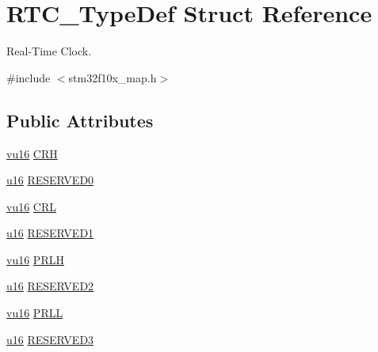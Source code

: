 \hypertarget{struct_r_t_c___type_def}{}\section{R\+T\+C\+\_\+\+Type\+Def Struct Reference}
\label{struct_r_t_c___type_def}


Real-\/\+Time Clock.  




{\ttfamily \#include $<$stm32f10x\+\_\+map.\+h$>$}

\subsection*{Public Attributes}
\begin{DoxyCompactItemize}
\item 
\hyperlink{agilefox_2library_2inc_2stm32f10x__type_8h_a9e9f2c67df0bbcd2dd7753693525ee07}{vu16} \hyperlink{struct_r_t_c___type_def_a8eb1b48381b16f72b508cc7d55338737}{C\+RH}
\item 
\hyperlink{agilefox_2library_2inc_2stm32f10x__type_8h_a9e6c91d77e24643b888dbd1a1a590054}{u16} \hyperlink{struct_r_t_c___type_def_a333883fc62c0c65191bd0e825a879b3c}{R\+E\+S\+E\+R\+V\+E\+D0}
\item 
\hyperlink{agilefox_2library_2inc_2stm32f10x__type_8h_a9e9f2c67df0bbcd2dd7753693525ee07}{vu16} \hyperlink{struct_r_t_c___type_def_a777228792aa47e88c33492c356646865}{C\+RL}
\item 
\hyperlink{agilefox_2library_2inc_2stm32f10x__type_8h_a9e6c91d77e24643b888dbd1a1a590054}{u16} \hyperlink{struct_r_t_c___type_def_acf6a76e18964d92f3e126dd04369dd8a}{R\+E\+S\+E\+R\+V\+E\+D1}
\item 
\hyperlink{agilefox_2library_2inc_2stm32f10x__type_8h_a9e9f2c67df0bbcd2dd7753693525ee07}{vu16} \hyperlink{struct_r_t_c___type_def_aad7497095513a3ff014d992635749a6b}{P\+R\+LH}
\item 
\hyperlink{agilefox_2library_2inc_2stm32f10x__type_8h_a9e6c91d77e24643b888dbd1a1a590054}{u16} \hyperlink{struct_r_t_c___type_def_a73b05aa7838f6f0d4eee7958a8e33eb8}{R\+E\+S\+E\+R\+V\+E\+D2}
\item 
\hyperlink{agilefox_2library_2inc_2stm32f10x__type_8h_a9e9f2c67df0bbcd2dd7753693525ee07}{vu16} \hyperlink{struct_r_t_c___type_def_a9b6eaa7ffd3f91456d66fb0a1d629e6e}{P\+R\+LL}
\item 
\hyperlink{agilefox_2library_2inc_2stm32f10x__type_8h_a9e6c91d77e24643b888dbd1a1a590054}{u16} \hyperlink{struct_r_t_c___type_def_a489ecffc8b93ce2b510020cbd41bcfec}{R\+E\+S\+E\+R\+V\+E\+D3}

\end{DoxyCompactItemize}
